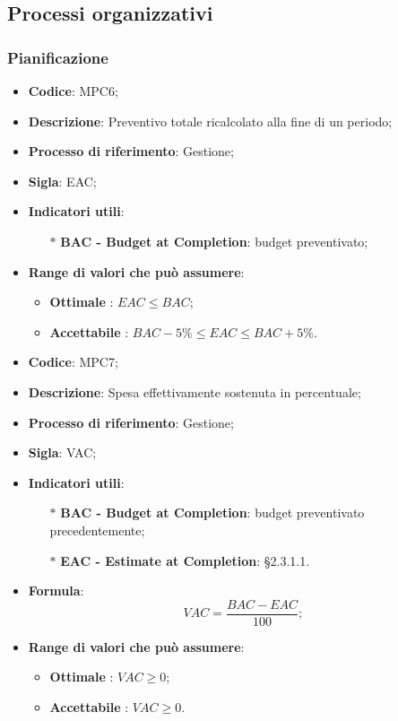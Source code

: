\subsection{Processi organizzativi}
\subsubsection{Pianificazione}
\vspace{-1cm}
\begin{itemize}
	\item \textbf{Codice}: MPC6;
	\item \textbf{Descrizione}: Preventivo totale ricalcolato alla fine di un periodo;
	\item \textbf{Processo di riferimento}: Gestione;
	\item \textbf{Sigla}: EAC;
	\item \textbf{Indicatori utili}: 
		\begin{itemize}
		\item[$\ast$] \textbf{BAC - Budget at Completion}: budget preventivato;
		\end{itemize}
	\item \textbf{Range di valori che può assumere}: 
		\begin{itemize}
			\item \textbf{Ottimale} : $EAC \leq BAC$;
			\item \textbf{Accettabile} : $BAC - 5 \% \leq EAC \leq BAC + 5 \%$.
		\end{itemize}
\end{itemize}
\vspace{-1cm}
\begin{itemize}
	\item \textbf{Codice}: MPC7;
	\item \textbf{Descrizione}: Spesa effettivamente sostenuta in percentuale;
	\item \textbf{Processo di riferimento}: Gestione;
	\item \textbf{Sigla}: VAC;
	\item \textbf{Indicatori utili}: 
		\begin{itemize}
		\item[$\ast$] \textbf{BAC - Budget at Completion}: budget preventivato precedentemente;
		\item[$\ast$] \textbf{EAC - Estimate at Completion}: §2.3.1.1.
		\end{itemize}
	\item \textbf{Formula}: \[ VAC = \frac{BAC - EAC}{100};\]
	\item \textbf{Range di valori che può assumere}: 
		\begin{itemize}
			\item \textbf{Ottimale} : $ VAC \geq 0 $;
			\item \textbf{Accettabile} : $ VAC \geq 0 $.
		\end{itemize}
\end{itemize}

